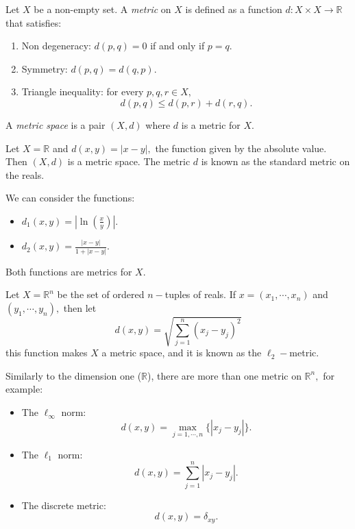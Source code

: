 \documentclass[
	fontsize=10pt, %
	twoside=false, %
	secnumdepth=1, %
]{kaobook}
\begin{document}
\begin{definition}
Let $X$ be a non-empty set. A \emph{metric} on $X$ is defined as a function $d:X\times X\to \mathbb{R}$ that satisfies:
\begin{enumerate}
\item Non degeneracy: $d(p,q)=0$ if and only if $p=q.$
\item Symmetry: $d(p,q)=d(q,p).$
\item Triangle inequality: for every $p,q,r\in X,$ $$d(p,q)\leq d(p,r)+d(r,q).$$
\end{enumerate}

A \emph{metric space} is a pair $(X,d)$ where $d$ is a metric for $X.$
\end{definition}
\begin{example}
Let $X=\mathbb{R}$ and $d(x,y)=|x-y|,$ the function given by the absolute value. Then $(X,d)$ is a metric space. The metric $d$ is known as the standard metric on the reals.

We can consider the functions:
\begin{itemize}
\item $d_1(x,y)=\left|\ln\left(\frac{x}{y}\right)\right|.$

\item $d_2(x,y)=\frac{|x-y|}{1+|x-y|}.$
\end{itemize}

Both functions are metrics for $X.$
\end{example}

\begin{example}
Let $X=\mathbb{R}^n$ be the set of ordered $n-$tuples of reals. If $x=(x_1,\cdots,x_n)$ and $(y_1,\cdots,y_n),$ then let $$d(x,y)=\sqrt{\sum_{j=1}^n (x_j-y_j)^2}$$ this function makes $X$ a metric space, and it is known as the $\ell_2-$metric.

Similarly to the dimension one ($\mathbb{R}$), there are more than one metric on $\mathbb{R}^n,$ for example:

\begin{itemize}
\item The $\ell_\infty$ norm: $$d(x,y)=\max_{j=1,\cdots,n} \{|x_j-y_j|\}.$$

\item The $\ell_1$ norm: $$d(x,y)=\sum_{j=1}^n |x_j-y_j|.$$

\item The discrete metric: $$d(x,y)=\delta_{xy}.$$
\end{itemize}
\end{example}
\end{document}
